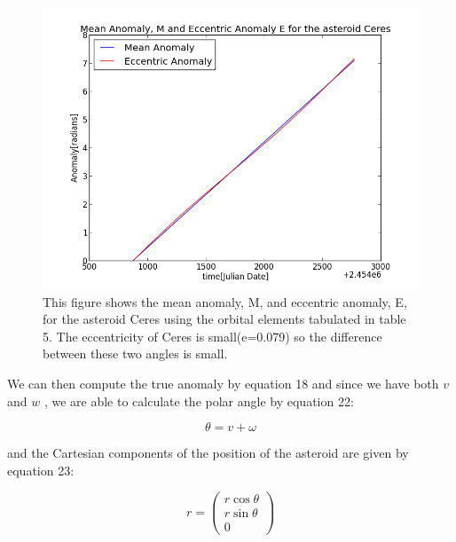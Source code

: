 \documentclass[letterpaper,12pt]{article}
\begin{document}
\FloatBarrier
\begin{figure}[h!]
\centering
\includegraphics[scale=0.5]{figure3.png}
\caption{This figure shows the mean anomaly, M, and eccentric anomaly, E, for the asteroid Ceres using the orbital elements tabulated in table 5. The eccentricity of Ceres is small(e=0.079) so the difference between these two angles is small.}
\end{figure}
\FloatBarrier


We can then compute the true anomaly by equation 18 and since we have both \begin{math} v \end{math} and \begin{math} w \end{math} , we are able to calculate the polar angle by equation 22:

\begin{equation}
\theta = v + \omega
\end{equation}

and the Cartesian components of the position of the asteroid are given by equation 23:

\begin{equation}
r=
\begin{pmatrix}
  r\cos \theta \\
  r\sin \theta \\
  0
 \end{pmatrix} 
\end{equation}
\end{document}
